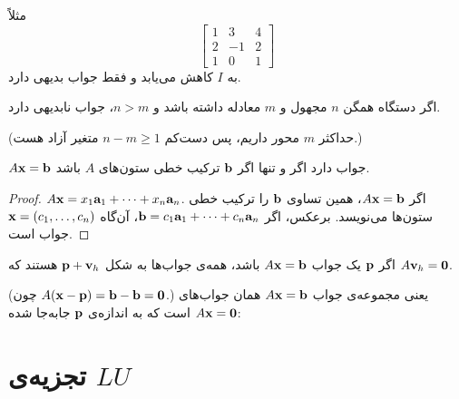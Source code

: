 مثلاً 
\[
\begin{bmatrix}1&3&4\\2&-1&2\\1&0&1\end{bmatrix}
\]
به $I$ کاهش می‌یابد و فقط جواب بدیهی دارد.

\begin{corollary}\label{cor:more-unknowns}
اگر دستگاه همگن  $n$ مجهول و $m$ معادله داشته باشد و $n>m$، جواب نابدیهی دارد.
\end{corollary}
(حداکثر $m$ محور داریم، پس دست‌کم $n-m\ge1$ متغیر آزاد هست.)

\begin{theorem}\label{thm:solvable-combination}
$A\mathbf{x}=\mathbf{b}$ جواب دارد اگر و تنها اگر $\mathbf{b}$ ترکیب خطی  ستون‌های $A$ باشد.
\end{theorem}
\begin{proof}
$A\mathbf{x}=x_1\mathbf{a}_1+\dots+x_n\mathbf{a}_n$. اگر $A\mathbf{x}=\mathbf{b}$، همین تساوی $\mathbf{b}$ را ترکیب خطی ستون‌ها می‌نویسد. برعکس، اگر $\mathbf{b}=c_1\mathbf{a}_1+\dots+c_n\mathbf{a}_n$، آن‌گاه $\mathbf{x}=(c_1,\dots,c_n)$ جواب است.
\end{proof}

\begin{theorem}\label{thm:general-solution}
اگر $\mathbf{p}$ یک جواب $A\mathbf{x}=\mathbf{b}$ باشد، همه‌ی جواب‌ها به شکل $\mathbf{p}+\mathbf{v}_h$ هستند که $A\mathbf{v}_h=\mathbf{0}$.
\end{theorem}
(چون $A(\mathbf{x}-\mathbf{p})=\mathbf{b}-\mathbf{b}=\mathbf{0}$.) یعنی مجموعه‌ی جواب $A\mathbf{x}=\mathbf{b}$ همان جواب‌های $A\mathbf{x}=\mathbf{0}$ است که به اندازه‌ی $\mathbf{p}$ جابه‌جا شده:
\begin{center}
\end{center}

\section{تجزیه‌ی $LU$}

